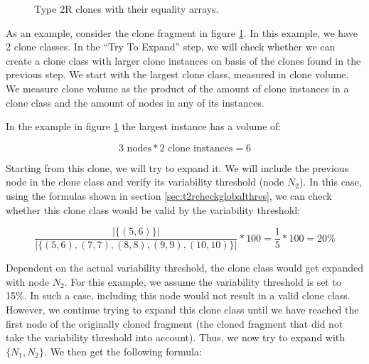 \begin{figure}[H]
\begin{parcolumns}{2}
\end{parcolumns}
\caption{Type 2R clones with their equality arrays.}
\label{fig:trytoexpand}
\end{figure}

As an example, consider the clone fragment in figure \ref{fig:trytoexpand}. In this example, we have 2 clone classes. In the ``Try To Expand'' step, we will check whether we can create a clone class with larger clone instances on basis of the clones found in the previous step. We start with the largest clone class, measured in clone volume. We measure clone volume as the product of the amount of clone instances in a clone class and the amount of nodes in any of its instances.

In the example in figure \ref{fig:trytoexpand} the largest instance has a volume of:

\begin{equation}\label{eq:clonevolume}
3 \text{ nodes} * 2 \text{ clone instances} = 6
\end{equation}

Starting from this clone, we will try to expand it. We will include the previous node in the clone class and verify its variability threshold (node $N_2$). In this case, using the formulas shown in section \ref{sec:t2rcheckglobalthres}, we can check whether this clone class would be valid by the variability threshold:

\begin{equation}\label{eq:variabilitycombined1}
\frac{|\{(5,6)\}|}{|\{(5,6),(7,7),(8,8),(9,9),(10,10)\}|}*100 = \frac{1}{5}*100 = 20\%
\end{equation}

Dependent on the actual variability threshold, the clone class would get expanded with node $N_2$. For this example, we assume the variability threshold is set to 15\%. In such a case, including this node would not result in a valid clone class. However, we continue trying to expand this clone class until we have reached the first node of the originally cloned fragment (the cloned fragment that did not take the variability threshold into account). Thus, we now try to expand with $\{N_1, N_2\}$. We then get the following formula:

